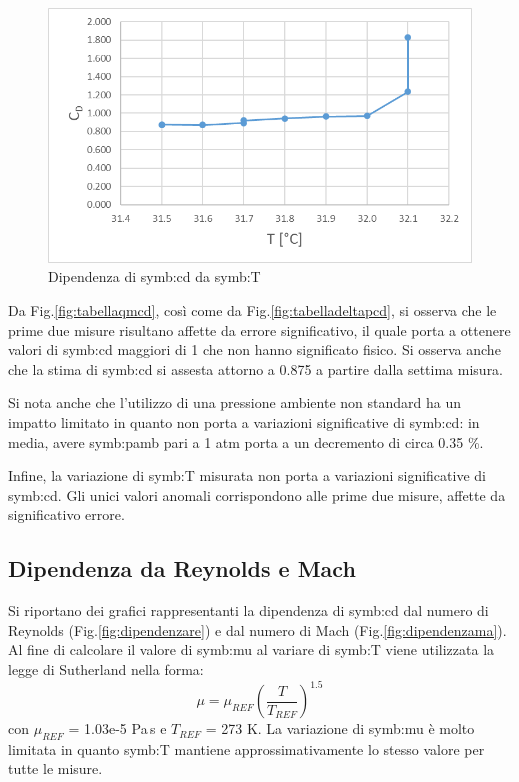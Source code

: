 \begin{figure}
	\centering
	\includegraphics[width=0.5\linewidth]{"chapters/5-laboratorio/tabellaTcd"}
	\caption{Dipendenza di \gls{symb:cd} da \gls{symb:T}}
	\label{fig:tabellatcd}
\end{figure}
Da Fig.\ref{fig:tabellaqmcd}, così come da Fig.\ref{fig:tabelladeltapcd}, si osserva che le prime due misure risultano affette da errore significativo, il quale porta a ottenere valori di \gls{symb:cd} maggiori di 1 che non hanno significato fisico. Si osserva anche che la stima di \gls{symb:cd} si assesta attorno a 0.875 a partire dalla settima misura. 

Si nota anche che l'utilizzo di una pressione ambiente non standard ha un impatto limitato in quanto non porta a variazioni significative di \gls{symb:cd}: in media, avere \gls{symb:pamb} pari a 1 atm porta a un decremento di circa 0.35 \%.

Infine, la variazione di \gls{symb:T} misurata non porta a variazioni significative di \gls{symb:cd}. Gli unici valori anomali corrispondono alle prime due misure, affette da significativo errore. 

\subsection{Dipendenza da Reynolds e Mach}
Si riportano dei grafici rappresentanti la dipendenza di \gls{symb:cd} dal numero di Reynolds (Fig.\ref{fig:dipendenzare}) e dal numero di Mach (Fig.\ref{fig:dipendenzama}). 
Al fine di calcolare il valore di \gls{symb:mu} al variare di \gls{symb:T} viene utilizzata la legge di Sutherland nella forma:
\begin{equation}
	\mu=\mu_{\textit{REF}}(\frac{T}{T_{\textit{REF}}})^{1.5}
\end{equation}
con $\mu_{\textit{REF}}$ = 1.03e-5 Pa\,s e $T_{\textit{REF}}$ = 273 K.
La variazione di \gls{symb:mu} è molto limitata in quanto \gls{symb:T} mantiene approssimativamente lo stesso valore per tutte le misure. 

